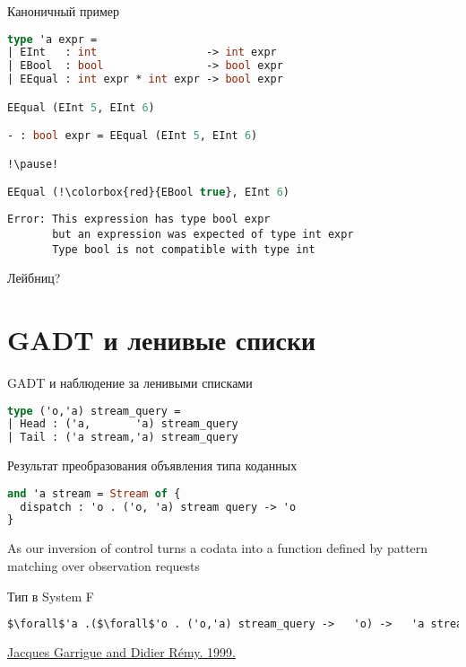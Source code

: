 \documentclass[10pt, mathserif]{beamer}
\theoremstyle{definition}
\begin{document}
\begin{frame}[fragile]{Каноничный пример}
\begin{lstlisting}[language=ocaml,mathescape=true]
type 'a expr =
| EInt   : int                 -> int expr
| EBool  : bool                -> bool expr
| EEqual : int expr * int expr -> bool expr

EEqual (EInt 5, EInt 6)

- : bool expr = EEqual (EInt 5, EInt 6)

!\pause!

EEqual (!\colorbox{red}{EBool true}, EInt 6)
\end{lstlisting}

\begin{verbatim}
Error: This expression has type bool expr
       but an expression was expected of type int expr
       Type bool is not compatible with type int
\end{verbatim}
\end{frame}

\begin{frame}{Лейбниц?}
 
\end{frame}

\section{GADT и ленивые списки}

\begin{frame}[fragile]{GADT и наблюдение за ленивыми списками}
\begin{lstlisting}[language=ocaml,mathescape=true]
type ('o,'a) stream_query =
| Head : ('a,       'a) stream_query
| Tail : ('a stream,'a) stream_query
\end{lstlisting}
\end{frame}

\begin{frame}[fragile]{Результат преобразования объявления типа коданных}
\begin{lstlisting}[language=ocaml]
and 'a stream = Stream of {
  dispatch : 'o . ('o, 'a) stream query -> 'o
}
\end{lstlisting}
As our inversion of control turns a codata into a
function defined by pattern matching over observation requests

\vspace{1cm}

Тип в System F 
\begin{lstlisting}[language=ocaml,mathescape=true]
$\forall$'a .($\forall$'o . ('o,'a) stream_query ->   'o) ->   'a stream
\end{lstlisting}
\vspace{1cm}
\href{https://caml.inria.fr/pub/papers/garrigue_remy-poly-ic99.ps.gz}{Jacques Garrigue and Didier Rémy. 1999. }
\end{frame}
\end{document}
